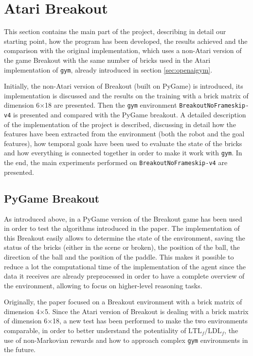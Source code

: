 \section{Atari Breakout}
This section contains the main part of the project, describing in detail our
starting point, how the program has been developed, the results achieved and the
comparison with the original implementation, which uses a non-Atari version
of the game Breakout \cite{DBLP:journals/corr/abs-1807-06333} with the same
number of bricks used in the Atari implementation of \texttt{gym},
already introduced in section \ref{sec:openaigym}.

Initially, the non-Atari version of Breakout (built on PyGame) is introduced,
its implementation is discussed and the results on the training with a brick
matrix of dimension 6$\times$18 are presented. Then the \texttt{gym}
environment \texttt{BreakoutNoFrameskip-v4} is presented and compared with the
PyGame breakout. A detailed description of the implementation of the project
is described, discussing in detail how the features have been extracted from
the environment (both the robot and the goal features), how temporal goals
have been used to evaluate the state of the bricks and how everything is
connected together in order to make it work with \texttt{gym}. In the end,
the main experiments performed on \texttt{BreakoutNoFrameskip-v4} are
presented.

\subsection{PyGame Breakout}
As introduced above, in \cite{DBLP:journals/corr/abs-1807-06333} a PyGame
version of the Breakout game has been used in order to test the algorithms
introduced in the paper. The implementation of this Breakout easily allows
to determine the state of the environment, saving the status of the bricks
(either in the scene or broken), the position of the ball, the direction of
the ball and the position of the paddle. This makes it possible to reduce
a lot the computational time of the implementation of the agent since the
data it receives are already preprocessed in order to have a complete
overview of the environment, allowing to focus on higher-level reasoning
tasks.

Originally, the paper focused on a Breakout environment with a brick matrix
of dimension 4$\times$5. Since the Atari version of Breakout is dealing with
a brick matrix of dimension 6$\times$18, a new test has been performed to
make the two environments comparable, in order to better understand the
potentiality of $\text{LTL}_f/\text{LDL}_f$, the use of non-Markovian rewards
and how to approach complex \texttt{gym} environments in the future.


